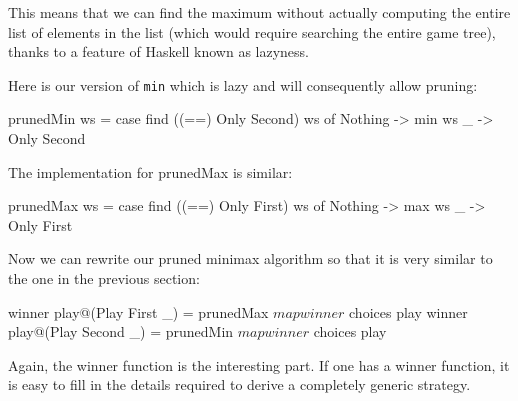 This means that we can find the maximum without actually computing the entire list of elements in the list (which would require searching the entire game tree), thanks to a feature of Haskell known as lazyness.

Here is our version of \texttt{min} which is lazy and will consequently allow pruning:

\begin{code}
  prunedMin ws = 
    case find ((==) Only Second) ws of
      Nothing -> min ws
      _ -> Only Second
\end{code}

The implementation for prunedMax is similar:

\begin{code}
  prunedMax ws = 
    case find ((==) Only First) ws of
      Nothing -> max ws
      _ -> Only First
\end{code}


Now we can rewrite our pruned minimax algorithm so that it is very similar to the one in the previous section:

\begin{code}
  winner play@(Play First _) = 
    prunedMax $ map winner $ choices play
  winner play@(Play Second _) = 
    prunedMin $ map winner $ choices play
\end{code}


Again, the winner function is the interesting part. If one has a winner function, it is easy to fill in the details required to derive a completely generic strategy.
